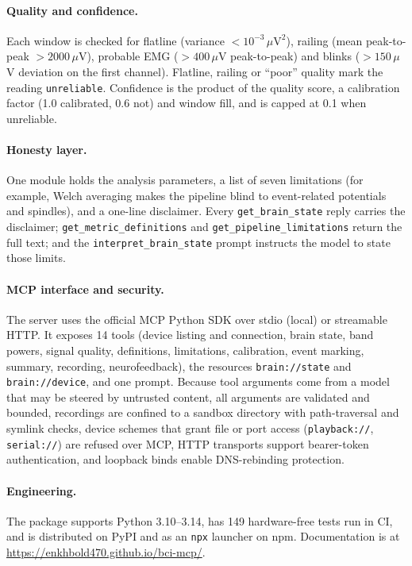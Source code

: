 \documentclass[10pt,twocolumn,letterpaper]{article}
\begin{document}
\paragraph{Quality and confidence.} Each window is checked for flatline
(variance ${<}10^{-3}\,\mu\mathrm{V}^2$), railing (mean peak-to-peak
${>}2000\,\mu$V), probable EMG (${>}400\,\mu$V peak-to-peak) and blinks
(${>}150\,\mu$V deviation on the first channel). Flatline, railing or ``poor''
quality mark the reading \texttt{unreliable}. Confidence is the product of the
quality score, a calibration factor (1.0 calibrated, 0.6 not) and window fill,
and is capped at 0.1 when unreliable.

\paragraph{Honesty layer.} One module holds the analysis parameters, a list of
seven limitations (for example, Welch averaging makes the pipeline blind to
event-related potentials and spindles), and a one-line disclaimer. Every
\texttt{get\_brain\_state} reply carries the disclaimer;
\texttt{get\_metric\_definitions} and \texttt{get\_pipeline\_limitations} return
the full text; and the \texttt{interpret\_brain\_state} prompt instructs the
model to state those limits.

\paragraph{MCP interface and security.} The server uses the official MCP Python
SDK over stdio (local) or streamable HTTP. It exposes 14 tools (device listing
and connection, brain state, band powers, signal quality, definitions,
limitations, calibration, event marking, summary, recording, neurofeedback), the
resources \texttt{brain://state} and \texttt{brain://device}, and one prompt.
Because tool arguments come from a model that may be steered by untrusted
content, all arguments are validated and bounded, recordings are confined to a
sandbox directory with path-traversal and symlink checks, device schemes that
grant file or port access (\texttt{playback://}, \texttt{serial://}) are refused
over MCP, HTTP transports support bearer-token authentication, and loopback
binds enable DNS-rebinding protection.

\paragraph{Engineering.} The package supports Python 3.10--3.14, has 149
hardware-free tests run in CI, and is distributed on PyPI and as an \texttt{npx}
launcher on npm. Documentation is at
\url{https://enkhbold470.github.io/bci-mcp/}.
\end{document}
